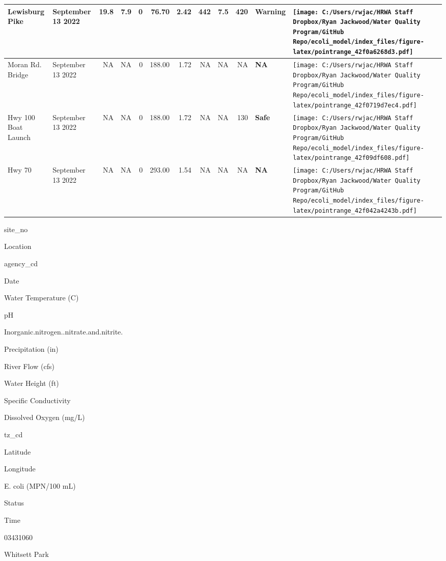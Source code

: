 \documentclass[
]{article}
\begin{document}
\begin{table}
\begin{tabular}[t]{>{}l||>{\raggedright\arraybackslash}p{2cm}|r|r|r|r|r|r|r|r|>{}l|>{}l}
\hline
Lewisburg Pike & September 13 2022 & 19.8 & 7.9 & 0 & 76.70 & 2.42 & 442 & 7.5 & 420 & \textbf{Warning} & \texttt{[image: C:/Users/rwjac/HRWA Staff Dropbox/Ryan Jackwood/Water Quality Program/GitHub Repo/ecoli\_model/index\_files/figure-latex/pointrange\_42f0a6268d3.pdf]}\\
\hline
Moran Rd. Bridge & September 13 2022 & NA & NA & 0 & 188.00 & 1.72 & NA & NA & NA & \textbf{NA} & \texttt{[image: C:/Users/rwjac/HRWA Staff Dropbox/Ryan Jackwood/Water Quality Program/GitHub Repo/ecoli\_model/index\_files/figure-latex/pointrange\_42f0719d7ec4.pdf]}\\
\hline
Hwy 100 Boat Launch & September 13 2022 & NA & NA & 0 & 188.00 & 1.72 & NA & NA & 130 & \textbf{Safe} & \texttt{[image: C:/Users/rwjac/HRWA Staff Dropbox/Ryan Jackwood/Water Quality Program/GitHub Repo/ecoli\_model/index\_files/figure-latex/pointrange\_42f09df608.pdf]}\\
\hline
Hwy 70 & September 13 2022 & NA & NA & 0 & 293.00 & 1.54 & NA & NA & NA & \textbf{NA} & \texttt{[image: C:/Users/rwjac/HRWA Staff Dropbox/Ryan Jackwood/Water Quality Program/GitHub Repo/ecoli\_model/index\_files/figure-latex/pointrange\_42f042a4243b.pdf]}\\
\hline
\end{tabular}
\end{table}

site\_no

Location

agency\_cd

Date

Water Temperature (C)

pH

Inorganic.nitrogen..nitrate.and.nitrite.

Precipitation (in)

River Flow (cfs)

Water Height (ft)

Specific Conductivity

Dissolved Oxygen (mg/L)

tz\_cd

Latitude

Longitude

E. coli (MPN/100 mL)

Status

Time

03431060

Whitsett Park
\end{document}
